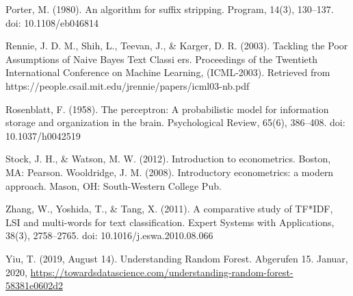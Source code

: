 \documentclass[a4paper,12pt]{article}
\begin{document}
\begin{thebibliography}{9}
Porter, M. (1980). An algorithm for suffix stripping. Program, 14(3), 130–137. doi: 10.1108/eb046814

Rennie, J. D. M., Shih, L., Teevan, J., \& Karger, D. R. (2003). Tackling the Poor Assumptions of Naive Bayes Text Classi 
ers. Proceedings of the Twentieth International Conference on Machine Learning, (ICML-2003). Retrieved from https://people.csail.mit.edu/jrennie/papers/icml03-nb.pdf

Rosenblatt, F. (1958). The perceptron: A probabilistic model for information storage and organization in the brain. Psychological Review, 65(6), 386–408. doi: 10.1037/h0042519

Stock, J. H., \& Watson, M. W. (2012). Introduction to econometrics. Boston, MA: Pearson.
Wooldridge, J. M. (2008). Introductory econometrics: a modern approach. Mason, OH: South-Western College Pub.

Zhang, W., Yoshida, T., \& Tang, X. (2011). A comparative study of TF*IDF, LSI and multi-words for text classification. Expert Systems with Applications, 38(3), 2758–2765. doi: 10.1016/j.eswa.2010.08.066


Yiu, T. (2019, August 14). Understanding Random Forest. Abgerufen 15. Januar, 2020, \url{https://towardsdatascience.com/understanding-random-forest-58381e0602d2}




\end{thebibliography}
\end{document}
